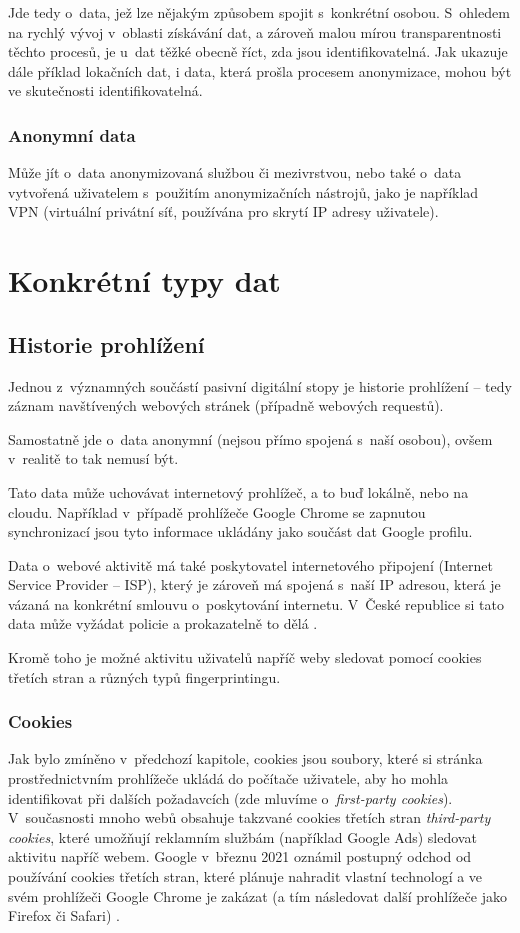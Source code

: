 Jde tedy o~data, jež lze nějakým způsobem spojit s~konkrétní osobou. S~ohledem na rychlý vývoj v~oblasti získávání dat, a zároveň malou mírou transparentnosti těchto procesů, je u~dat těžké obecně říct, zda jsou identifikovatelná. Jak ukazuje dále příklad lokačních dat, i data, která prošla procesem anonymizace, mohou být ve skutečnosti identifikovatelná.  

\subsubsection*{Anonymní data}

Může jít o~data anonymizovaná službou či mezivrstvou, nebo také o~data vytvořená uživatelem s~použitím anonymizačních nástrojů, jako je například VPN (virtuální privátní síť, používána pro skrytí IP adresy uživatele).


\section{Konkrétní typy dat}

\subsection{Historie prohlížení}
Jednou z~významných součástí pasivní digitální stopy je historie prohlížení -- tedy záznam navštívených webových stránek (případně webových requestů).


Samostatně jde o~data anonymní (nejsou přímo spojená s~naší osobou), ovšem v~realitě to tak nemusí být.

Tato data může uchovávat internetový prohlížeč, a to buď lokálně, nebo na cloudu. Například v~případě prohlížeče Google Chrome se zapnutou synchronizací jsou tyto informace ukládány jako součást dat Google profilu.

Data o~webové aktivitě má také poskytovatel internetového připojení (Internet Service Provider -- ISP), který je zároveň má spojená s~naší IP adresou, která je vázaná na konkrétní smlouvu o~poskytování internetu. V~České republice si tato data může vyžádat policie a prokazatelně to dělá \citep{policie-isp}.

Kromě toho je možné aktivitu uživatelů napříč weby sledovat pomocí cookies třetích stran a různých typů fingerprintingu.

\subsubsection*{Cookies}
Jak bylo zmíněno v~předchozí kapitole, cookies jsou soubory, které si stránka prostřednictvním prohlížeče ukládá do počítače uživatele, aby ho mohla identifikovat při dalších požadavcích (zde mluvíme o~\textit{first-party cookies}). V~současnosti mnoho webů obsahuje takzvané cookies třetích stran \textit{third-party cookies}, které umožňují reklamním službám (například Google Ads) sledovat aktivitu napříč webem.
Google v~březnu 2021 oznámil postupný odchod od používání cookies třetích stran, které plánuje nahradit vlastní technologí a ve svém prohlížeči Google Chrome je zakázat (a tím následovat další prohlížeče jako Firefox či Safari) \citep{google-privacy-announcement}.


